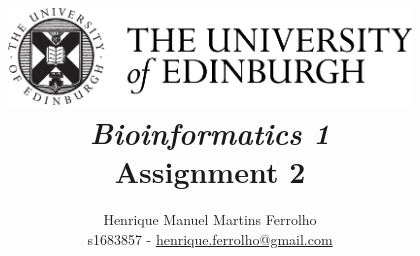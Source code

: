 \title{
    \includegraphics[width=0.8\textwidth]{res/university-of-edinburgh-logo.png}\\
    \bigskip\bigskip
    \bigskip\bigskip
    \bigskip\bigskip
    \huge{\textbf{\textit{Bioinformatics 1}}}\\
    \bigskip\bigskip
    \bigskip\bigskip
    \large\textbf{Assignment 2}\\
    \bigskip\bigskip
    \bigskip\bigskip
    \bigskip\bigskip
    \bigskip\bigskip
    \bigskip\bigskip
    \bigskip\bigskip
}

\author{
    Henrique Manuel Martins Ferrolho\\
    s1683857 - \href{mailto:henrique.ferrolho@gmail.com}{henrique.ferrolho@gmail.com}
    \bigskip
}

\maketitle
\thispagestyle{empty}

\newpage
